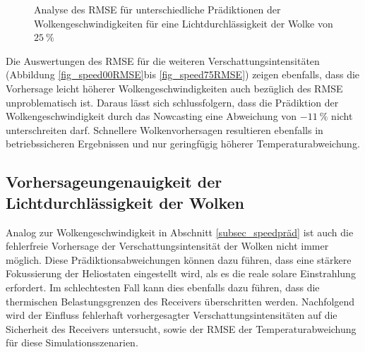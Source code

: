 \begin{figure}[h!]
    \centering
    \setlength{\fboxsep}{1pt}
    \setlength{\fboxrule}{1pt}
    \caption[Analyse des RMSE für unterschiedliche Prädiktionen der Wolkengeschwindigkeiten für eine Lichtdurchlässigkeit der Wolke von $\SI{25}{\percent}$]{Analyse des RMSE für unterschiedliche Prädiktionen der Wolkengeschwindigkeiten für eine Lichtdurchlässigkeit der Wolke von $\SI{25}{\percent}$}
    \label{fig_speed25RMSE}
\end{figure} \pagebreak

Die Auswertungen des RMSE für die weiteren Verschattungsintensitäten (Abbildung \ref{fig_speed00RMSE}\linebreak bis \ref{fig_speed75RMSE}) zeigen ebenfalls, dass die Vorhersage leicht höherer Wolkengeschwindigkeiten auch bezüglich des RMSE unproblematisch ist.
Daraus lässt sich schlussfolgern, dass die Prädiktion der Wolkengeschwindigkeit durch das Nowcasting eine Abweichung von $\SI{-11}{\percent}$ nicht unterschreiten darf.
Schnellere Wolkenvorhersagen resultieren ebenfalls in betriebssicheren Ergebnissen und nur geringfügig höherer Temperaturabweichung.


\subsection{Vorhersageungenauigkeit der Lichtdurchlässigkeit der Wolken} \label{subsec_shadingpräd}
Analog zur Wolkengeschwindigkeit in Abschnitt \ref{subsec_speedpräd} ist auch die fehlerfreie Vorhersage der Verschattungsintensität der Wolken nicht immer möglich.
Diese Prädiktionsabweichungen können dazu führen, dass eine stärkere Fokussierung der Heliostaten eingestellt wird, als es die reale solare Einstrahlung erfordert.
Im schlechtesten Fall kann dies ebenfalls dazu führen, dass die thermischen Belastungsgrenzen des Receivers überschritten werden.
Nachfolgend wird der Einfluss fehlerhaft vorhergesagter Verschattungsintensitäten auf die Sicherheit des Receivers untersucht, sowie der RMSE der Temperaturabweichung für diese Simulationsszenarien.

